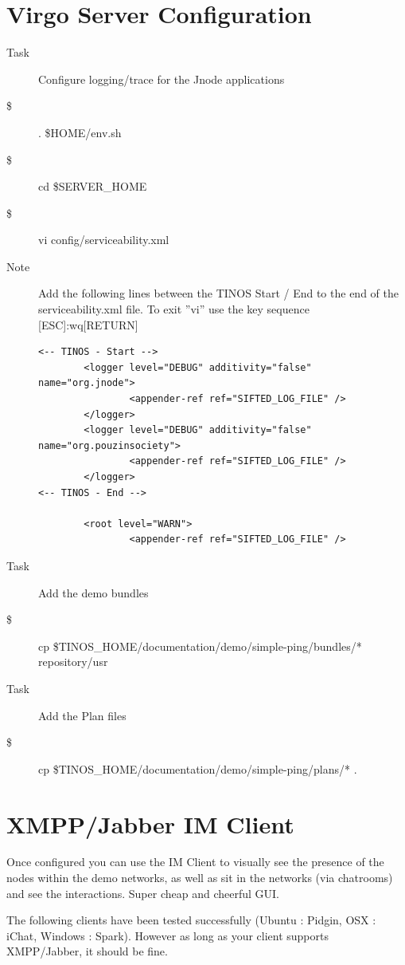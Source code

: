 \section{Virgo Server Configuration}

\begin{description}
\item [Task] Configure logging/trace for the Jnode applications
\item [\$] . \$HOME/env.sh
\item [\$] cd \$SERVER\_HOME
\item [\$] vi config/serviceability.xml
\item [Note] Add the following lines between the TINOS Start / End to the end
of the serviceability.xml file. To exit ''vi'' use the key sequence [ESC]:wq[RETURN]
\begin{verbatim}
<-- TINOS - Start -->
        <logger level="DEBUG" additivity="false" name="org.jnode">
                <appender-ref ref="SIFTED_LOG_FILE" />
        </logger>
        <logger level="DEBUG" additivity="false" name="org.pouzinsociety">
                <appender-ref ref="SIFTED_LOG_FILE" />
        </logger>
<-- TINOS - End -->

        <root level="WARN">
                <appender-ref ref="SIFTED_LOG_FILE" />
\end{verbatim}
\item [Task] Add the demo bundles
\item [\$] cp \$TINOS\_HOME/documentation/demo/simple-ping/bundles/* repository/usr
\item [Task] Add the Plan files
\item [\$] cp \$TINOS\_HOME/documentation/demo/simple-ping/plans/* .
\end{description}

\section{XMPP/Jabber IM Client}
Once configured you can use the IM Client to visually see the presence of the nodes
within the demo networks, as well as sit in the networks (via chatrooms) and see the
interactions. Super cheap and cheerful GUI.

The following clients have been tested successfully (Ubuntu : Pidgin, OSX : iChat,
 Windows : Spark). However as long as your client supports XMPP/Jabber, it should be
fine.

